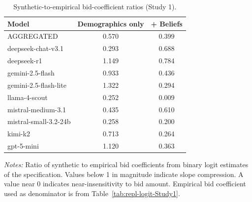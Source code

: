 \begin{table}[h]
\centering
\caption{Synthetic-to-empirical bid-coefficient ratios (Study 1).}
\label{tab:slope-ratios-Study1}
\begin{threeparttable}
\footnotesize
\begin{tabular}{lcc}
\toprule
Model & Demographics only & + Beliefs \\
\midrule
AGGREGATED &   0.570 &   0.399 \\
\midrule
deepseek-chat-v3.1 &   0.293 &   0.688 \\
deepseek-r1 &   1.149 &   0.784 \\
gemini-2.5-flash &   0.933 &   0.436 \\
gemini-2.5-flash-lite &   1.322 &   0.294 \\
llama-4-scout &   0.252 &   0.009 \\
mistral-medium-3.1 &   0.435 &   0.610 \\
mistral-small-3.2-24b &   0.258 &   0.200 \\
kimi-k2 &   0.713 &   0.264 \\
gpt-5-mini &   1.120 &   0.363 \\
\bottomrule
\end{tabular}
\begin{tablenotes}\footnotesize
\item \textit{Notes:} Ratio of synthetic to empirical bid coefficients from binary logit estimates of the \textcite{Aldy2012} specification. 
Values below 1 in magnitude indicate slope compression. 
A value near 0 indicates near-insensitivity to bid amount. 
Empirical bid coefficient used as denominator is from Table~\ref{tab:repl-logit-Study1}.
\end{tablenotes}
\end{threeparttable}
\end{table}
